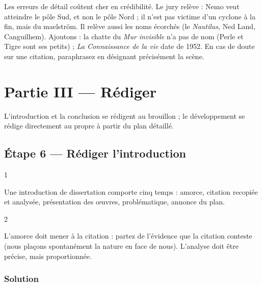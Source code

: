 \documentclass[11pt,a4paper]{article}
\begin{document}
\begin{piege}

Les erreurs de détail coûtent cher en crédibilité. Le jury relève : Nemo veut atteindre le pôle Sud, et non le pôle Nord ; il n'est pas victime d'un cyclone à la fin, mais du maelström. Il relève aussi les noms écorchés (le \emph{Nautilus}, Ned Land, Canguilhem). Ajoutons : la chatte du \emph{Mur invisible} n'a pas de nom (Perle et Tigre sont ses petits) ; \emph{La Connaissance de la vie} date de 1952. En cas de doute sur une citation, paraphrasez en désignant précisément la scène.

\end{piege}

\hypertarget{partie-iii-ruxe9diger}{%
\section{Partie III --- Rédiger}\label{partie-iii-ruxe9diger}}

L'introduction et la conclusion se rédigent au brouillon ; le développement se rédige directement au propre à partir du plan détaillé.

\hypertarget{uxe9tape-6-ruxe9diger-lintroduction}{%
\subsection{Étape 6 --- Rédiger l'introduction}\label{uxe9tape-6-ruxe9diger-lintroduction}}

\begin{indication}{1}

Une introduction de dissertation comporte cinq temps : amorce, citation recopiée et analysée, présentation des œuvres, problématique, annonce du plan.

\end{indication}

\begin{indication}{2}

L'amorce doit mener à la citation : partez de l'évidence que la citation conteste (nous plaçons spontanément la nature en face de nous). L'analyse doit être précise, mais proportionnée.

\end{indication}

\hypertarget{solution-5}{%
\subsubsection{Solution}\label{solution-5}}
\end{document}
